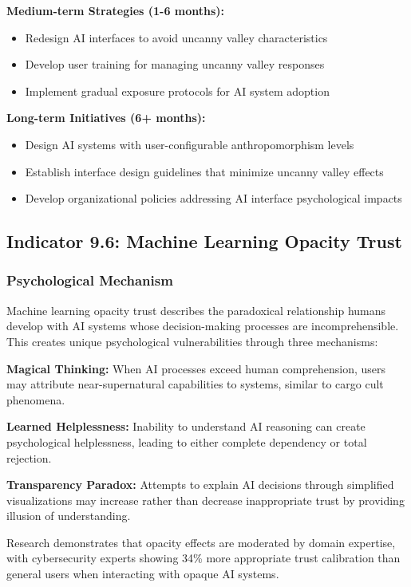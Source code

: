 \documentclass[11pt,a4paper]{article}
\begin{document}
\textbf{Medium-term Strategies (1-6 months):}
\begin{itemize}
\item Redesign AI interfaces to avoid uncanny valley characteristics
\item Develop user training for managing uncanny valley responses
\item Implement gradual exposure protocols for AI system adoption
\end{itemize}

\textbf{Long-term Initiatives (6+ months):}
\begin{itemize}
\item Design AI systems with user-configurable anthropomorphism levels
\item Establish interface design guidelines that minimize uncanny valley effects
\item Develop organizational policies addressing AI interface psychological impacts
\end{itemize}

\subsection{Indicator 9.6: Machine Learning Opacity Trust}

\subsubsection{Psychological Mechanism}

Machine learning opacity trust describes the paradoxical relationship humans develop with AI systems whose decision-making processes are incomprehensible. This creates unique psychological vulnerabilities through three mechanisms:

\textbf{Magical Thinking:} When AI processes exceed human comprehension, users may attribute near-supernatural capabilities to systems, similar to cargo cult phenomena\cite{cargo2023}.

\textbf{Learned Helplessness:} Inability to understand AI reasoning can create psychological helplessness, leading to either complete dependency or total rejection\cite{seligman1972}.

\textbf{Transparency Paradox:} Attempts to explain AI decisions through simplified visualizations may increase rather than decrease inappropriate trust by providing illusion of understanding\cite{transparency2024}.

Research demonstrates that opacity effects are moderated by domain expertise, with cybersecurity experts showing 34\% more appropriate trust calibration than general users when interacting with opaque AI systems\cite{expertise2024}.
\end{document}
